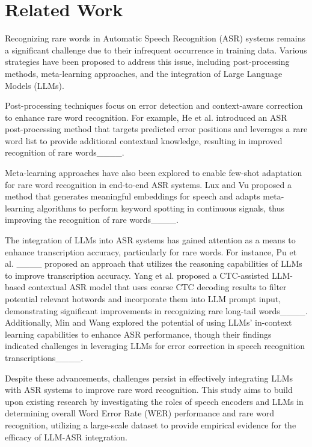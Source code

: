 \section{Related Work}
\label{sec:related}

Recognizing rare words in Automatic Speech Recognition (ASR) systems remains a significant challenge due to their infrequent occurrence in training data. Various strategies have been proposed to address this issue, including post-processing methods, meta-learning approaches, and the integration of Large Language Models (LLMs).

Post-processing techniques focus on error detection and context-aware correction to enhance rare word recognition. For example, He et al. introduced an ASR post-processing method that targets predicted error positions and leverages a rare word list to provide additional contextual knowledge, resulting in improved recognition of rare words____.

Meta-learning approaches have also been explored to enable few-shot adaptation for rare word recognition in end-to-end ASR systems. Lux and Vu proposed a method that generates meaningful embeddings for speech and adapts meta-learning algorithms to perform keyword spotting in continuous signals, thus improving the recognition of rare words____.

The integration of LLMs into ASR systems has gained attention as a means to enhance transcription accuracy, particularly for rare words. For instance, Pu et al. ____ proposed an approach that utilizes the reasoning capabilities of LLMs to improve transcription accuracy. Yang et al. proposed a CTC-assisted LLM-based contextual ASR model that uses coarse CTC decoding results to filter potential relevant hotwords and incorporate them into LLM prompt input, demonstrating significant improvements in recognizing rare long-tail words____. Additionally, Min and Wang explored the potential of using LLMs' in-context learning capabilities to enhance ASR performance, though their findings indicated challenges in leveraging LLMs for error correction in speech recognition transcriptions____.

Despite these advancements, challenges persist in effectively integrating LLMs with ASR systems to improve rare word recognition. This study aims to build upon existing research by investigating the roles of speech encoders and LLMs in determining overall Word Error Rate (WER) performance and rare word recognition, utilizing a large-scale dataset to provide empirical evidence for the efficacy of LLM-ASR integration.